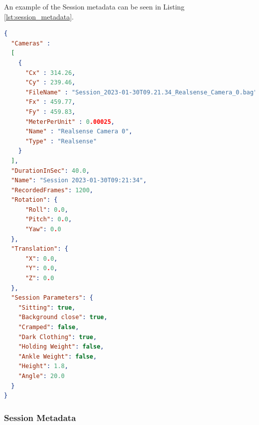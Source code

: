 An example of the Session metadata can be seen in Listing \ref{lst:session_metadata}.

\begin{lstlisting}[language=json,
                   firstnumber=1,
                   caption={[Example of session metadata]{Example of the Session metadata with a single Realsense Camera which was recorded for 40 seconds at around 30 frames per second resulting in 1200 frames. Some values have been changed to increase readability.}},
                   label={lst:session_metadata}]
{
  "Cameras" : 
  [
    {
      "Cx" : 314.26,
      "Cy" : 239.46,
      "FileName" : "Session_2023-01-30T09.21.34_Realsense_Camera_0.bag",
      "Fx" : 459.77,
      "Fy" : 459.83,
      "MeterPerUnit" : 0.00025,
      "Name" : "Realsense Camera 0",
      "Type" : "Realsense"
    }
  ],
  "DurationInSec": 40.0,
  "Name": "Session 2023-01-30T09:21:34",
  "RecordedFrames": 1200,
  "Rotation": {
      "Roll": 0.0,
      "Pitch": 0.0,
      "Yaw": 0.0
  },
  "Translation": {
      "X": 0.0,
      "Y": 0.0,
      "Z": 0.0
  },
  "Session Parameters": {
    "Sitting": true,
    "Background close": true,
    "Cramped": false,
    "Dark Clothing": true,
    "Holding Weight": false,
    "Ankle Weight": false,
    "Height": 1.8,
    "Angle": 20.0
  }
}
\end{lstlisting}

\subsubsection{Session Metadata}